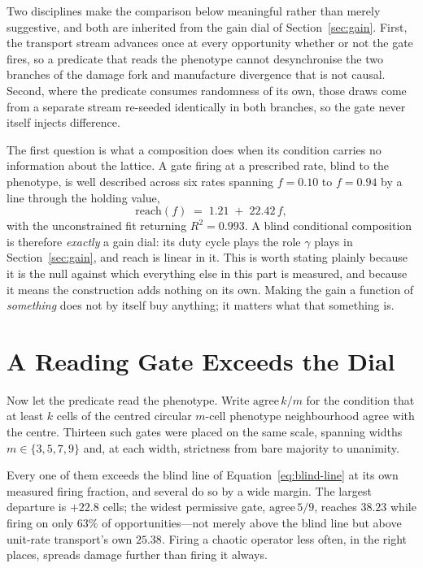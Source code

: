 \documentclass[man,12pt,floatsintext,donotrepeattitle]{apa7}
\begin{document}
Two disciplines make the comparison below meaningful rather than merely
suggestive, and both are inherited from the gain dial of
Section~\ref{sec:gain}. First, the transport stream advances once at every
opportunity whether or not the gate fires, so a predicate that reads the
phenotype cannot desynchronise the two branches of the damage fork and
manufacture divergence that is not causal. Second, where the predicate consumes
randomness of its own, those draws come from a separate stream re-seeded
identically in both branches, so the gate never itself injects difference.

The first question is what a composition does when its condition carries no
information about the lattice. A gate firing at a prescribed rate, blind to the
phenotype, is well described across six rates spanning $f = 0.10$ to $f = 0.94$
by a line through the holding value,
%
\begin{equation}
  \mathrm{reach}(f) \;=\; 1.21 \;+\; 22.42\,f ,
  \label{eq:blind-line}
\end{equation}
%
with the unconstrained fit returning $R^{2} = 0.993$. A blind conditional
composition is therefore \emph{exactly} a gain dial: its duty cycle plays the
role $\gamma$ plays in Section~\ref{sec:gain}, and reach is linear in it. This is
worth stating plainly because it is the null against which everything else in
this part is measured, and because it means the construction adds nothing on its
own. Making the gain a function of \emph{something} does not by itself buy
anything; it matters what that something is.

\section{A Reading Gate Exceeds the Dial}
\label{sec:reading-gate}

Now let the predicate read the phenotype. Write $\mathrm{agree}\,k/m$ for the
condition that at least $k$ cells of the centred circular $m$-cell phenotype
neighbourhood agree with the centre. Thirteen such gates were placed on the same
scale, spanning widths $m \in \{3,5,7,9\}$ and, at each width, strictness from
bare majority to unanimity.

Every one of them exceeds the blind line of Equation~\ref{eq:blind-line} at its
own measured firing fraction, and several do so by a wide margin. The largest
departure is $+22.8$ cells; the widest permissive gate, $\mathrm{agree}\,5/9$,
reaches $38.23$ while firing on only $63\%$ of opportunities---not merely above
the blind line but above unit-rate transport's own $25.38$. Firing a chaotic
operator less often, in the right places, spreads damage further than firing it
always.
\end{document}
